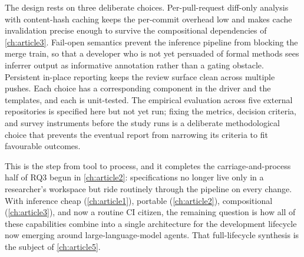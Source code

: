 The design rests on three deliberate choices. Per-pull-request diff-only analysis
with content-hash caching keeps the per-commit overhead low and makes cache
invalidation precise enough to survive the compositional dependencies of
\cref{ch:article3}. Fail-open semantics prevent the inference pipeline from
blocking the merge train, so that a developer who is not yet persuaded of formal
methods sees inferrer output as informative annotation rather than a gating
obstacle. Persistent in-place reporting keeps the review surface clean across
multiple pushes. Each choice has a corresponding component in the driver and the
templates, and each is unit-tested. The empirical evaluation across five external
repositories is specified here but not yet run; fixing the metrics, decision
criteria, and survey instruments before the study runs is a deliberate
methodological choice that prevents the eventual report from narrowing its
criteria to fit favourable outcomes.

This is the step from tool to process, and it completes the carriage-and-process
half of RQ3 begun in \cref{ch:article2}: specifications no longer live only in a
researcher's workspace but ride routinely through the pipeline on every change.
With inference cheap (\cref{ch:article1}), portable (\cref{ch:article2}),
compositional (\cref{ch:article3}), and now a routine CI citizen, the remaining
question is how all of these capabilities combine into a single architecture for
the development lifecycle now emerging around large-language-model agents. That
full-lifecycle synthesis is the subject of \cref{ch:article5}.
